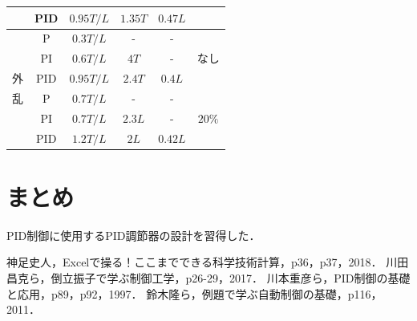 \documentclass[12pt]{jsarticle}
\begin{document}
\begin{description}
\begin{table}[H]
\begin{center}
\begin{tabular}{|c|c|c|c|c|c|}
       & PID & $0.95T/L$ & $1.35T$ & $0.47L$ &\\ \hline
       & P & $0.3T/L$ & - & - & \\
       & PI & $0.6T/L$ & $4T$ & - & なし\\
       外 & PID & $0.95T/L$ & $2.4T$ & $0.4L$ &\\ \cline{2-6}
       乱 & P & $0.7T/L$ & - & - & \\
       & PI & $0.7T/L$ & $2.3L$ & - & $20\%$\\
       & PID & $1.2T/L$ & $2L$ & $0.42L$ &\\ \hline
    \end{tabular}
  \end{center}
\end{table}
\end{description}

\section{まとめ}
PID制御に使用するPID調節器の設計を習得した．

\begin{thebibliography}{9}
   神足史人，Excelで操る！ここまでできる科学技術計算，p36，p37，2018．
   川田昌克ら，倒立振子で学ぶ制御工学，p26-29，2017．
   川本重彦ら，PID制御の基礎と応用，p89，p92，1997．
   鈴木隆ら，例題で学ぶ自動制御の基礎，p116，2011．
\end{thebibliography}
\end{document}

